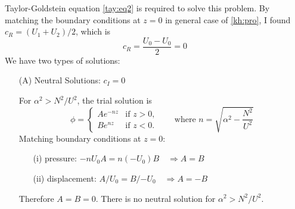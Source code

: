 Taylor-Goldstein equation \eqref{tay:eq2} is required to solve this
problem. By matching the boundary conditions at $z=0$ in general
case of \eqref{kh:pro}, I found $c_R=(U_1+U_2)/2$, which is
\begin{equation}\label{str:cr}
    c_R=\frac{U_0-U_0}{2}=0
\end{equation}
We have two types of solutions:
\begin{enumerate}
\item[(A)] Neutral Solutions: $c_I=0$

For $\alpha^2>N^2/U^2$, the trial solution is
\begin{equation}\label{str:tr1}
\phi =
\begin{cases}
Ae^{-nz} &\text{if $z>0$,}\\
Be^{nz} &\text{if $z<0$.}
\end{cases}
\qquad \text{where }n=\sqrt{\alpha^2-\frac{N^2}{U^2}}
\end{equation}
Matching boundary conditions at $z=0$:
\begin{enumerate}
  \item[(i)] pressure: $-nU_0A=n(-U_0)B \quad\Rightarrow A=B$
  \item[(ii)] displacement: $A/U_0=B/{-U_0} \quad\Rightarrow A={-B}$
\end{enumerate}
Therefore $A=B=0$. There is no neutral solution for
$\alpha^2>N^2/U^2$.


\end{enumerate}
